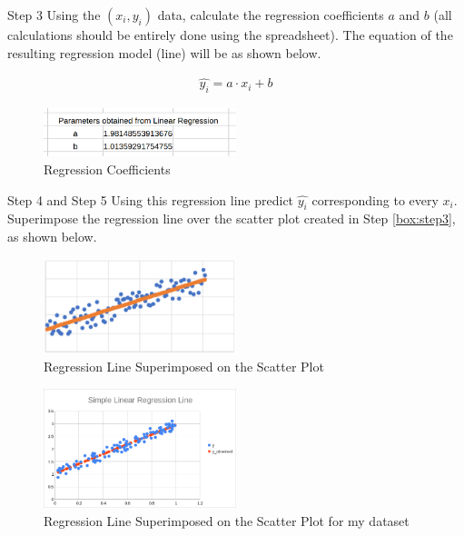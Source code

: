 \begin{custombox}[label={box:step3}]{Step 3}
	Using the $(x_i, y_i)$ data, calculate the regression coefficients $a$ and $b$ (all calculations should be entirely done using the spreadsheet). The equation of the resulting regression model (line) will be as shown below.

	\begin{align}
		\widehat{y_i} = {a} \cdot {x_i} + b
	\end{align}
\end{custombox}

\begin{figure}[H]
	\centering
	\includegraphics[width=0.5\textwidth]{Images/Step3.png}
	\caption{Regression Coefficients}
\end{figure}

\begin{custombox}[label={box:step4and5}]{Step 4 and Step 5}
	Using this regression line predict $\widehat{y_i}$ corresponding to every $x_i$. Superimpose the regression line over the scatter plot created in Step \ref{box:step3}, as shown below.

	\begin{figure}[H]
		\centering
		\includegraphics[width=0.5\textwidth]{Images/Step45.png}
		\caption{Regression Line Superimposed on the Scatter Plot}
	\end{figure}
\end{custombox}

\begin{figure}[H]
	\centering
	\includegraphics[width=0.5\textwidth]{Images/regression.png}
	\caption{Regression Line Superimposed on the Scatter Plot for my dataset}
\end{figure}


